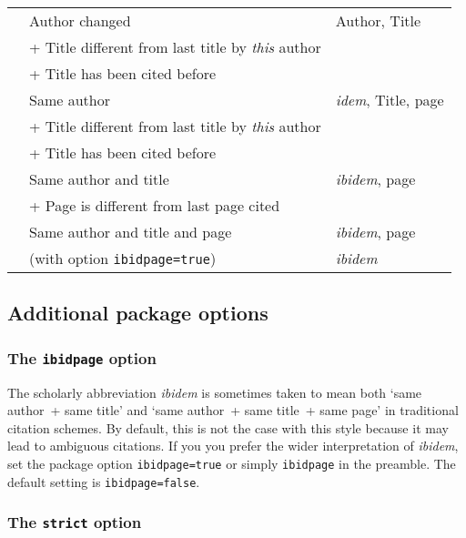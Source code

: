 \documentclass[a4paper]{article}
\newenvironment*{inlinetable}
  {\trivlist\footnotesize\item}
  {\endtrivlist}
\newcommand*{\code}[1]{%
  \detokenize\expandafter{\string#1}}
\begin{document}
\begin{inlinetable}
\begin{tabularx}{\linewidth}{@{}VlX@{}}
\cmidrule(r){1-1}\cmidrule(lr){2-2}\cmidrule(l){3-3}
\code{\cite{a1}}        & Author changed        & Author, Title \\
                        & + Title different from last title by \emph{this} author \\
                        & + Title has been cited before \\
\cmidrule(r){1-1}\cmidrule(lr){2-2}\cmidrule(l){3-3}
\code{\cite[55]{a2}}    & Same author           & \emph{idem}, Title, page \\
                        & + Title different from last title by \emph{this} author \\
                        & + Title has been cited before \\
\cmidrule(r){1-1}\cmidrule(lr){2-2}\cmidrule(l){3-3}
\code{\cite[25]{a2}}    & Same author and title & \emph{ibidem}, page \\
                        & + Page is different from last page cited \\
\cmidrule(r){1-1}\cmidrule(lr){2-2}\cmidrule(l){3-3}
\code{\cite[25]{a2}}    & Same author and title and page
						& \emph{ibidem}, page \\
\code{\cite[25]{a2}}    & (with option \texttt{ibidpage=true})
						& \emph{ibidem} \\
\bottomrule
\end{tabularx}
\end{inlinetable}

\clearpage

\subsection*{Additional package options}

\subsubsection*{The \texttt{ibidpage} option}

The scholarly abbreviation \emph{ibidem} is sometimes taken to mean
both `same author~+ same title' and `same author~+ same title~+ same
page' in traditional citation schemes. By default, this is not the
case with this style because it may lead to ambiguous citations. If
you you prefer the wider interpretation of \emph{ibidem}, set the
package option \texttt{ibidpage=true} or simply \texttt{ibidpage} in
the preamble. The default setting is \texttt{ibidpage=false}.

\subsubsection*{The \texttt{strict} option}
\end{document}
